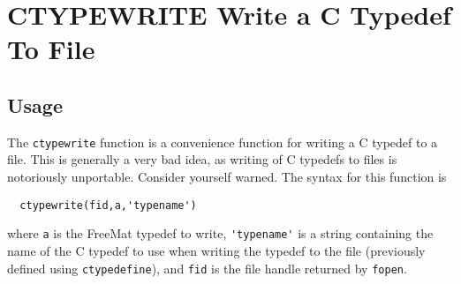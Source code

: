 \section{CTYPEWRITE Write a C Typedef To File}

\subsection{Usage }

The \verb|ctypewrite| function is a convenience function for
writing a C typedef to a file.  This is generally a very
bad idea, as writing of C typedefs to files is notoriously
unportable.  Consider yourself warned.  The syntax for this
function is 
\begin{verbatim}
  ctypewrite(fid,a,'typename')
\end{verbatim}
where \verb|a| is the FreeMat typedef to write, \verb|'typename'| is
a string containing the name of the C typedef to use when
writing the typedef to the file (previously defined using
\verb|ctypedefine|), and \verb|fid| is the file handle returned
by \verb|fopen|.
